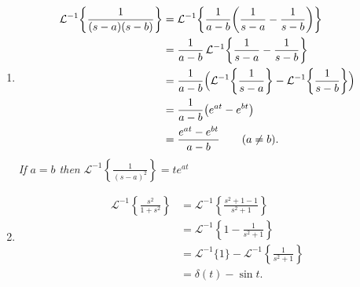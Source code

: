 \documentclass[11pt]{article}
\begin{document}
\begin{enumerate}[label=(\arabic*)]

\item
\[
\begin{aligned}
\mathcal{L}^{-1}\!\left\{\frac{1}{(s-a)(s-b)}\right\}
&= \mathcal{L}^{-1}\!\left\{\frac{1}{a-b}\!\left(\frac{1}{s-a}-\frac{1}{s-b}\right)\right\} \\
&= \frac{1}{a-b}\,\mathcal{L}^{-1}\!\left\{\frac{1}{s-a}-\frac{1}{s-b}\right\} \\
&= \frac{1}{a-b}\Bigl(\mathcal{L}^{-1}\!\left\{\frac{1}{s-a}\right\}
     -\mathcal{L}^{-1}\!\left\{\frac{1}{s-b}\right\}\Bigr) \\
&= \frac{1}{a-b}\bigl(e^{at}-e^{bt}\bigr) \\
&= \frac{e^{at}-e^{bt}}{a-b}\qquad (a\neq b).
\end{aligned}
\]
\emph{If $a=b$ then }$\displaystyle \mathcal{L}^{-1}\!\left\{\frac{1}{(s-a)^2}\right\}=t e^{at}$

\item
\[
\begin{aligned}
\mathcal{L}^{-1}\!\left\{\frac{s^{2}}{1+s^{2}}\right\}
&= \mathcal{L}^{-1}\!\left\{\frac{s^{2}+1-1}{s^{2}+1}\right\} \\[2pt]
&= \mathcal{L}^{-1}\!\left\{1-\frac{1}{s^{2}+1}\right\} \\[2pt]
&= \mathcal{L}^{-1}\{1\}-\mathcal{L}^{-1}\!\left\{\frac{1}{s^{2}+1}\right\} \\[2pt]
&= \delta(t)-\sin t.
\end{aligned}
\]

\end{enumerate}
\end{document}
